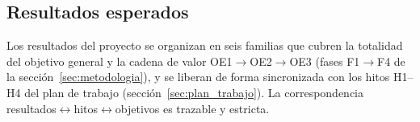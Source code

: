 
\subsection{Resultados esperados}

Los resultados del proyecto se organizan en seis familias que cubren la totalidad
del objetivo general y la cadena de valor OE1$\to$OE2$\to$OE3 (fases F1$\to$F4
de la sección~\ref{sec:metodologia}), y se liberan de forma sincronizada con los
hitos H1--H4 del plan de trabajo (sección~\ref{sec:plan_trabajo}). La
correspondencia resultados$\leftrightarrow$hitos$\leftrightarrow$objetivos es
trazable y estricta.

\medskip

